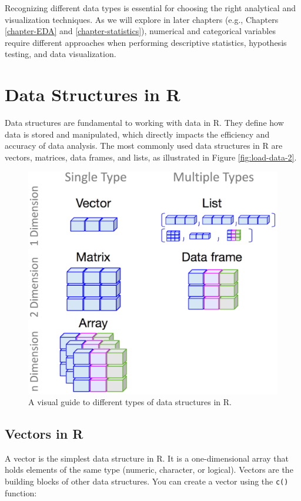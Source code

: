 \documentclass[
  11pt,
]{book}
\theoremstyle{definition}
\theoremstyle{definition}
\theoremstyle{definition}
\theoremstyle{definition}
\theoremstyle{remark}
\begin{document}
Recognizing different data types is essential for choosing the right analytical and visualization techniques. As we will explore in later chapters (e.g., Chapters \ref{chapter-EDA} and \ref{chapter-statistics}), numerical and categorical variables require different approaches when performing descriptive statistics, hypothesis testing, and data visualization.

\section{Data Structures in R}\label{data-structures-in-r}

Data structures are fundamental to working with data in R. They define how data is stored and manipulated, which directly impacts the efficiency and accuracy of data analysis. The most commonly used data structures in R are vectors, matrices, data frames, and lists, as illustrated in Figure \ref{fig:load-data-2}.

\begin{figure}[H]

{\centering \includegraphics[width=0.6\linewidth]{images/ch1_R-objects} 

}

\caption{A visual guide to different types of data structures in R.}\label{fig:R-objects}
\end{figure}

\subsection*{Vectors in R}\label{vectors-in-r}


A vector is the simplest data structure in R. It is a one-dimensional array that holds elements of the same type (numeric, character, or logical). Vectors are the building blocks of other data structures. You can create a vector using the \texttt{c()} function:
\end{document}

